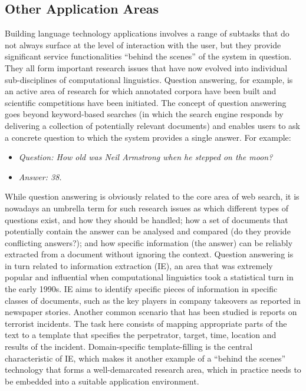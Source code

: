 \begin{multicols}{2}
\subsection{Other Application Areas}

Building language technology applications involves a range of subtasks that do not always surface at the level of interaction with the user, but they provide significant service functionalities “behind the scenes” of the system in question. They all form important research issues that have now evolved into individual sub-disciplines of computational linguistics. Question answering, for example, is an active area of research for which annotated corpora have been built and scientific competitions have been initiated. The concept of question answering goes beyond keyword-based searches (in which the search engine responds by delivering a collection of potentially relevant documents) and enables users to ask a concrete question to which the system provides a single answer. For example:

\begin{itemize}
\item[] \textit{Question: How old was Neil Armstrong when he stepped on the moon?}
\item[] \textit{Answer: 38.}
\end{itemize}

While question answering is obviously related to the core area of web search, it is nowadays an umbrella term for such research issues as which different types of questions exist, and how they should be handled; how a set of documents that potentially contain the answer can be analysed and compared (do they provide conflicting answers?); and how specific information (the answer) can be reliably extracted from a document without ignoring the context. Question answering is in turn related to information extraction (IE), an area that was extremely popular and influential when computational linguistics took a statistical turn in the early 1990s. IE aims to identify specific pieces of information in specific classes of documents, such as the key players in company takeovers as reported in newspaper stories. Another common scenario that has been studied is reports on terrorist incidents. The task here consists of mapping appropriate parts of the text to a template that specifies the perpetrator, target, time, location and results of the incident. Domain-specific template-filling is the central characteristic of IE, which makes it another example of a “behind the scenes” technology that forms a well-demarcated research area, which in practice needs to be embedded into a suitable application environment.


\end{multicols}
